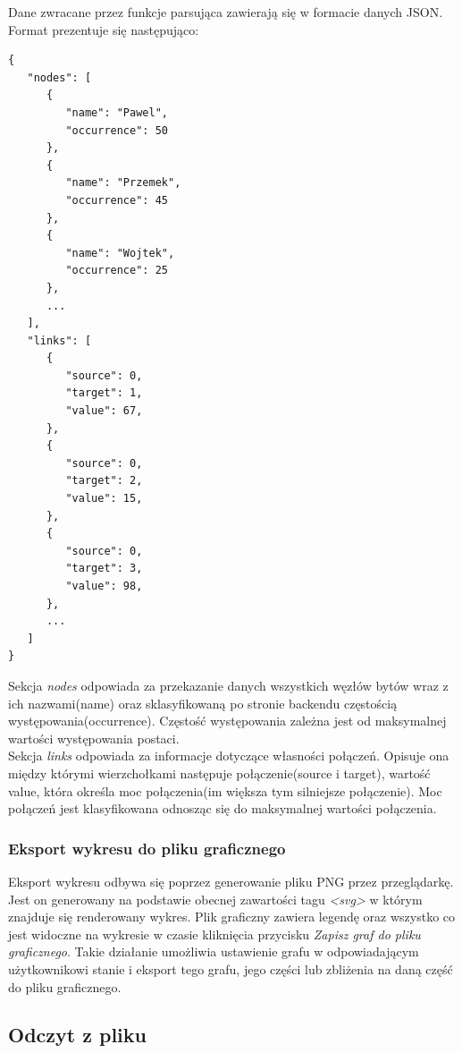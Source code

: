 \documentclass[12pt,a4paper]{article} %
\begin{document}
                Dane zwracane przez funkcje parsująca zawierają się w formacie danych JSON. Format prezentuje się następująco:
        \begin{lstlisting}
{
   "nodes": [
      {
         "name": "Pawel",
         "occurrence": 50
      },
      {
         "name": "Przemek",
         "occurrence": 45
      },
      {
         "name": "Wojtek",
         "occurrence": 25
      },
      ...
   ],
   "links": [
      {
         "source": 0,
         "target": 1,
         "value": 67,
      },
      {
         "source": 0,
         "target": 2,
         "value": 15,
      },
      {
         "source": 0,
         "target": 3,
         "value": 98,
      },
      ...
   ]
}
        \end{lstlisting}
        
        Sekcja \textit{nodes} odpowiada za przekazanie danych wszystkich węzłów bytów wraz z ich nazwami(name) oraz sklasyfikowaną po stronie backendu częstością występowania(occurrence). Częstość występowania zależna jest od maksymalnej wartości występowania postaci.\\
        
        Sekcja \textit{links} odpowiada za informacje dotyczące własności połączeń. Opisuje ona między którymi wierzchołkami następuje połączenie(source i target), wartość value, która określa moc połączenia(im większa tym silniejsze połączenie). Moc połączeń jest klasyfikowana odnosząc się do maksymalnej wartości połączenia.
            
            \subsubsection{Eksport wykresu do pliku graficznego}
            
                Eksport wykresu odbywa się poprzez generowanie pliku PNG przez przeglądarkę. Jest on generowany na podstawie obecnej zawartości tagu \textit{<svg>} w którym znajduje się renderowany wykres. Plik graficzny zawiera legendę oraz wszystko co jest widoczne na wykresie w czasie kliknięcia przycisku \textit{Zapisz graf do pliku graficznego}. Takie działanie umożliwia ustawienie grafu w odpowiadającym użytkownikowi stanie i eksport tego grafu, jego części lub zbliżenia na daną część do pliku graficznego.

            
        \subsection{Odczyt z pliku}
                            
\end{document}
